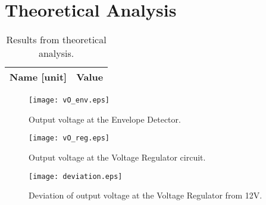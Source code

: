 \newpage
{}
\section{Theoretical Analysis}
\label{sec:analysis}



\begin{table}[H]
  \centering
  \begin{tabular}{|l|r|}
    \hline    
    {\bf Name [unit]} & {\bf Value} \\ \hline
    
  \end{tabular}
  \caption{Results from theoretical analysis.}
  \label{tab:teo}
\end{table}


\begin{figure}[H] \centering
  \texttt{[image: vO\_env.eps]}
  \caption{Output voltage at the Envelope Detector.}
  \label{fig:vO_env}
\end{figure} 

\begin{figure}[H] \centering
  \texttt{[image: vO\_reg.eps]}
  \caption{Output voltage at the Voltage Regulator circuit.}
  \label{fig:vO_reg}
\end{figure} 


\begin{figure}[H] \centering
  \texttt{[image: deviation.eps]}
  \caption{Deviation of output voltage at the Voltage Regulator from 12V.}
  \label{fig:vO-12}
\end{figure} 






